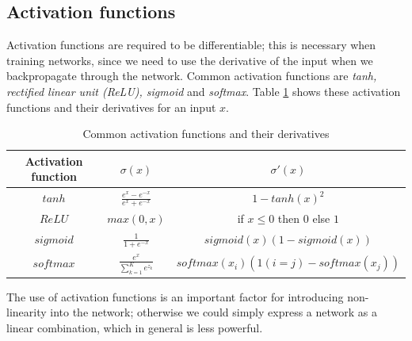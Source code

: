 \subsection{Activation functions}
Activation functions are required to be differentiable; this is necessary when
training networks, since we need to use the derivative of the input when we
backpropagate through the network.
Common activation functions are \emph{tanh, rectified linear unit (ReLU),
	sigmoid}  and \emph{softmax}.  Table \ref{tab:activation} shows these activation
functions and their derivatives for an input $x$.
\begin{table}[!htbp]
	\centering
	\begin{tabular}{|c||c|c|} \hline
		\textbf{Activation function} & $\sigma(x)$ & $\sigma'(x) $   \\ \hline \hline
		$tanh$ & $\frac{e^{x} - e^{-x}}{e^{x} + e^{-x}}$  & $1 - tanh(x)^2$ \\ 
		\hline
		$ReLU$ & $max(0,x)$ & if $x \leq 0$ then $0$ else $1$ \\ \hline
		$sigmoid$ & $\frac{1}{1 + e^{-x}}$ & $sigmoid(x) ( 1- sigmoid(x))$ \\ \hline
		$softmax$ & $\frac{e^{x}}{\sum^{K}_{k=1} e^{z_k}}$  & $softmax(x_i)(1(i=j) -
		softmax(x_j))$ \\ \hline
	\end{tabular}
	\caption{Common activation functions and their derivatives}
	\label{tab:activation}
\end{table}
The use of activation functions is an important factor for introducing
non-linearity into the network; otherwise we could simply express a network as a
linear combination, which in general is less powerful. 

